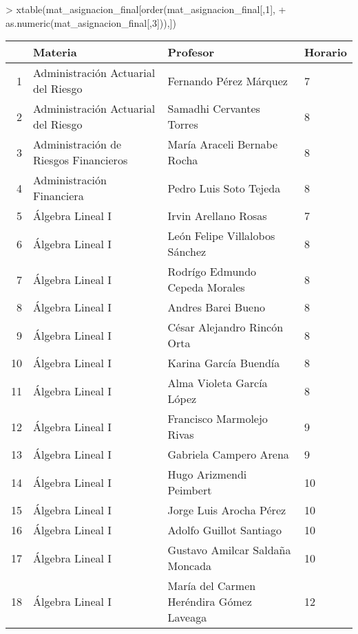   > xtable(mat_asignacion_final[order(mat_asignacion_final[,1],
                                    +                                   as.numeric(mat_asignacion_final[,3])),])
\begin{table}[ht]
\centering
\begin{tabular}{rlll}
\hline
& Materia & Profesor & Horario \\ \hline
1 & Administración Actuarial del Riesgo & Fernando Pérez Márquez & 7 \\ \hline
2 & Administración Actuarial del Riesgo & Samadhi Cervantes Torres & 8 \\ \hline
3 & Administración de Riesgos Financieros & María Araceli Bernabe Rocha & 8 \\ \hline
4 & Administración Financiera & Pedro Luis Soto Tejeda & 8 \\ \hline
5 & Álgebra Lineal I & Irvin Arellano Rosas & 7 \\ \hline
6 & Álgebra Lineal I & León Felipe Villalobos Sánchez & 8 \\ \hline
7 & Álgebra Lineal I & Rodrígo Edmundo Cepeda Morales & 8 \\ \hline
8 & Álgebra Lineal I & Andres Barei Bueno & 8 \\ \hline
9 & Álgebra Lineal I & César Alejandro Rincón Orta & 8 \\ \hline
10 & Álgebra Lineal I & Karina García Buendía & 8 \\ \hline
11 & Álgebra Lineal I & Alma Violeta García López & 8 \\ \hline
12 & Álgebra Lineal I & Francisco Marmolejo Rivas & 9 \\ \hline
13 & Álgebra Lineal I & Gabriela Campero Arena & 9 \\ \hline
14 & Álgebra Lineal I & Hugo Arizmendi Peimbert & 10 \\ \hline
15 & Álgebra Lineal I & Jorge Luis Arocha Pérez & 10 \\ \hline
16 & Álgebra Lineal I & Adolfo Guillot Santiago & 10 \\ \hline
17 & Álgebra Lineal I & Gustavo Amilcar Saldaña Moncada & 10 \\ \hline
18 & Álgebra Lineal I & María del Carmen Heréndira Gómez Laveaga & 12 \\ \hline

\end{tabular}
\end{table}
